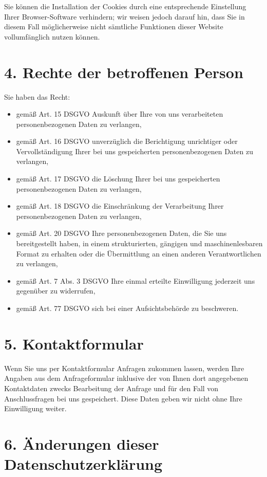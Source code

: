 \documentclass[a4paper,12pt]{article}
\begin{document}
Sie können die Installation der Cookies durch eine entsprechende Einstellung Ihrer Browser-Software verhindern; wir weisen jedoch darauf hin, dass Sie in diesem Fall möglicherweise nicht sämtliche Funktionen dieser Website vollumfänglich nutzen können.

\section*{4. Rechte der betroffenen Person}

Sie haben das Recht:

\begin{itemize}
    \item gemäß Art. 15 DSGVO Auskunft über Ihre von uns verarbeiteten personenbezogenen Daten zu verlangen,
    \item gemäß Art. 16 DSGVO unverzüglich die Berichtigung unrichtiger oder Vervollständigung Ihrer bei uns gespeicherten personenbezogenen Daten zu verlangen,
    \item gemäß Art. 17 DSGVO die Löschung Ihrer bei uns gespeicherten personenbezogenen Daten zu verlangen,
    \item gemäß Art. 18 DSGVO die Einschränkung der Verarbeitung Ihrer personenbezogenen Daten zu verlangen,
    \item gemäß Art. 20 DSGVO Ihre personenbezogenen Daten, die Sie uns bereitgestellt haben, in einem strukturierten, gängigen und maschinenlesbaren Format zu erhalten oder die Übermittlung an einen anderen Verantwortlichen zu verlangen,
    \item gemäß Art. 7 Abs. 3 DSGVO Ihre einmal erteilte Einwilligung jederzeit uns gegenüber zu widerrufen,
    \item gemäß Art. 77 DSGVO sich bei einer Aufsichtsbehörde zu beschweren.
\end{itemize}

\section*{5. Kontaktformular}

Wenn Sie uns per Kontaktformular Anfragen zukommen lassen, werden Ihre Angaben aus dem Anfrageformular inklusive der von Ihnen dort angegebenen Kontaktdaten zwecks Bearbeitung der Anfrage und für den Fall von Anschlussfragen bei uns gespeichert. Diese Daten geben wir nicht ohne Ihre Einwilligung weiter.

\section*{6. Änderungen dieser Datenschutzerklärung}
\end{document}
